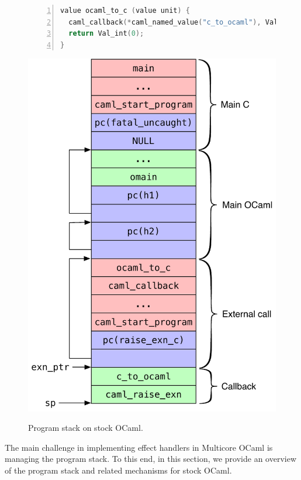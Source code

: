 \documentclass[sigplan,10pt,review,anonymous]{acmart}\settopmatter{printfolios=true,printccs=false,printacmref=false}
\begin{document}
\begin{figure}
\begin{minipage}{0.59\linewidth}
\begin{minipage}{\linewidth}
\begin{lstlisting}[language=c,numbers=left]
value ocaml_to_c (value unit) {
  caml_callback(*caml_named_value("c_to_ocaml"), Val_unit);
  return Val_int(0);
}
		\end{lstlisting}
    \label{code:meander_c}
	\end{minipage}
\end{minipage}
	\begin{minipage}{0.39\linewidth}
    \centering
    \includegraphics[scale=0.46]{figures/stock_stack}
    \label{fig:stock_stack}
  \end{minipage}
	\caption{Program stack on stock OCaml.}
\end{figure}

The main challenge in implementing effect handlers in Multicore OCaml is
managing the program stack. To this end, in this section, we provide an
overview of the program stack and related mechanisms for stock OCaml.
\end{document}
